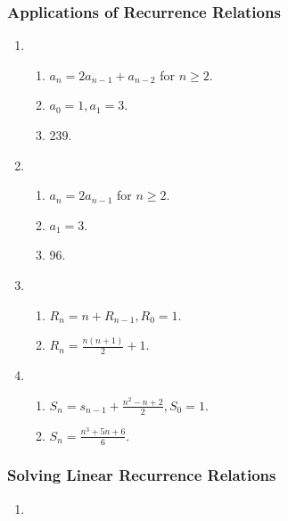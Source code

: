 \documentclass{../../cls/sig-alternate-05-2015}
\begin{document}
\subsubsection{Applications of Recurrence Relations}
\begin{enumerate}
\item \begin{enumerate}
	\item $a_n  = 2 a_{n - 1} + a_{n - 2}$ for $n \ge 2$.
	\item $a_0 = 1, a_1 = 3$.
	\item 239.
\end{enumerate}

\item \begin{enumerate}
	\item $a_n  = 2 a_{n - 1}$ for $n \ge 2$.
	\item $a_1 = 3$.
	\item 96.
\end{enumerate}

\item \begin{enumerate}
	\item $R_n = n + R_{n - 1}, R_0 = 1$.
	\item $R_n = \frac{n(n + 1)}{2} + 1$.
\end{enumerate}

\item \begin{enumerate}
	\item $S_n = s_{n - 1} + \frac{n^2 - n + 2}{2}, S_0 = 1$.
	\item $S_n = \frac{n^3 + 5n + 6}{6}$.
\end{enumerate}

\end{enumerate}

\subsubsection{Solving Linear Recurrence Relations}
\begin{enumerate}
\item 
\end{enumerate}
\end{document}
